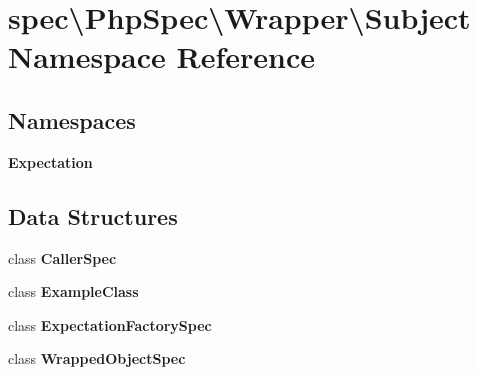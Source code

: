\section{spec\textbackslash{}Php\+Spec\textbackslash{}Wrapper\textbackslash{}Subject Namespace Reference}
\label{namespacespec_1_1_php_spec_1_1_wrapper_1_1_subject}
\subsection*{Namespaces}
\begin{DoxyCompactItemize}
\item 
 {\bf Expectation}
\end{DoxyCompactItemize}
\subsection*{Data Structures}
\begin{DoxyCompactItemize}
\item 
class {\bf Caller\+Spec}
\item 
class {\bf Example\+Class}
\item 
class {\bf Expectation\+Factory\+Spec}
\item 
class {\bf Wrapped\+Object\+Spec}
\end{DoxyCompactItemize}
